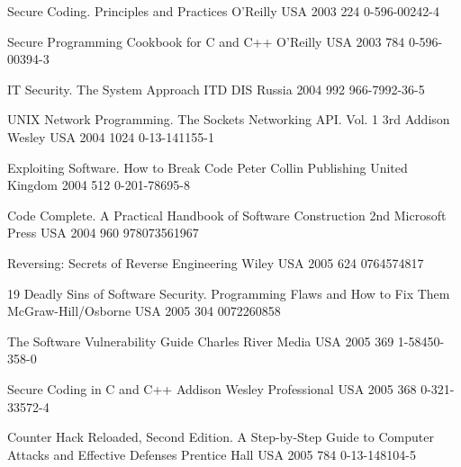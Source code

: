 \begin{thebibliography}{9}
		{
			\biband
			}
		{Secure Coding. Principles and Practices}
		{}
		{O'Reilly}
		{USA}
		{2003}
		{224}
		{0-596-00242-4}
	
		{
			\biband
			}
		{Secure Programming Cookbook for {C} and {C++}}
		{}
		{O'Reilly}
		{USA}
		{2003}
		{784}
		{0-596-00394-3}
	
		{}
		{{IT} Security. The System Approach}
		{}
		{ITD DIS}
		{Russia}
		{2004}
		{992}
		{966-7992-36-5}
	
		{
			\biband
			\biband
			}
		{{UNIX} Network Programming. The Sockets Networking {API}. Vol. 1}
		{3rd}
		{Addison Wesley}
		{USA}
		{2004}
		{1024}
		{0-13-141155-1}
	
		{
			\biband
			}
		{Exploiting Software. How to Break Code}
		{}
		{Peter Collin Publishing}
		{United Kingdom}
		{2004}
		{512}
		{0-201-78695-8}
	
		{}
		{Code Complete. A Practical Handbook of Software Construction}
		{2nd}
		{Microsoft Press}
		{USA}
		{2004}
		{960}
		{978073561967}
	
		{}
		{Reversing: Secrets of Reverse Engineering}
		{}
		{Wiley}
		{USA}
		{2005}
		{624}
		{0764574817}
	
		{
			\biband
			\biband
			}
		{19 Deadly Sins of Software Security. Programming Flaws and How to Fix Them}
		{}
		{McGraw-Hill/Osborne}
		{USA}
		{2005}
		{304}
		{0072260858}
	
		{
			\biband
			}
		{The Software Vulnerability Guide}
		{}
		{Charles River Media}
		{USA}
		{2005}
		{369}
		{1-58450-358-0}
	
		{}
		{Secure Coding in {C} and {C++}}
		{}
		{Addison Wesley Professional}
		{USA}
		{2005}
		{368}
		{0-321-33572-4}
	
		{
			\biband
			}
		{Counter Hack Reloaded, Second Edition. A Step-by-Step Guide to Computer Attacks and Effective Defenses}
		{}
		{Prentice Hall}
		{USA}
		{2005}
		{784}
		{0-13-148104-5}
	

\end{thebibliography}
